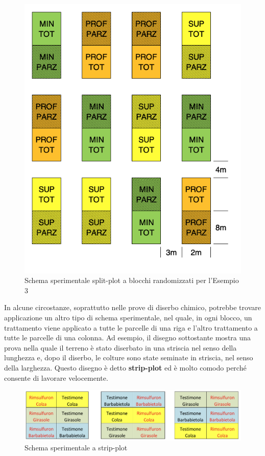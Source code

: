 \documentclass[a4paper,12pt,oneside]{book}
\theoremstyle{definition}
\theoremstyle{definition}
\theoremstyle{definition}
\theoremstyle{remark}
\begin{document}
\begin{figure}

{\centering \includegraphics[width=0.65\linewidth]{_images/Mappa3SPLIT} 

}

\caption{Schema sperimentale split-plot a blocchi randomizzati per l'Esempio 3}\label{fig:figName37}
\end{figure}

In alcune circostanze, soprattutto nelle prove di diserbo chimico,
potrebbe trovare applicazione un altro tipo di schema sperimentale, nel
quale, in ogni blocco, un trattamento viene applicato a tutte le
parcelle di una riga e l'altro trattamento a tutte le parcelle di una
colonna. Ad esempio, il disegno sottostante mostra una prova nella quale
il terreno è stato diserbato in una striscia nel senso della lunghezza
e, dopo il diserbo, le colture sono state seminate in striscia, nel
senso della larghezza. Questo disegno è detto \textbf{strip-plot} ed è
molto comodo perché consente di lavorare velocemente.

\begin{figure}

{\centering \includegraphics[width=0.9\linewidth]{_images/MappaStrip} 

}

\caption{Schema sperimentale a strip-plot}\label{fig:figName38}
\end{figure}
\end{document}
